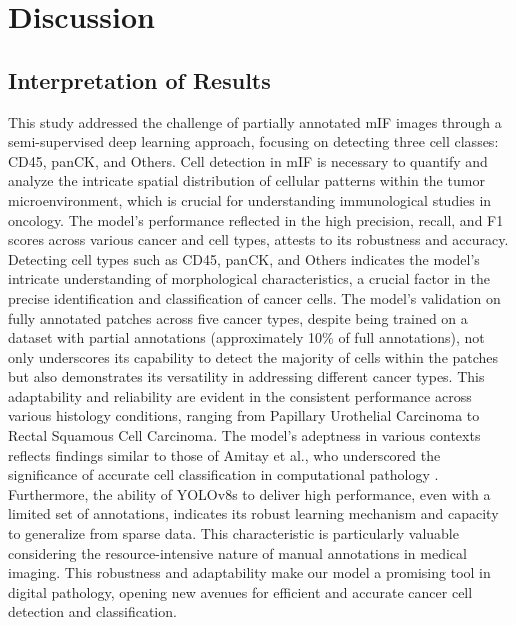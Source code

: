 \documentclass{midl} %
\begin{document}
\section{Discussion}
\subsection{Interpretation of Results}
This study addressed the challenge of partially annotated mIF images through a semi-supervised deep learning approach, focusing on detecting three cell classes: CD45, panCK, and Others. Cell detection in mIF is necessary to quantify and analyze the intricate spatial distribution of cellular patterns within the tumor microenvironment, which is crucial for understanding immunological studies in oncology. The model's performance reflected in the high precision, recall, and F1 scores across various cancer and cell types, attests to its robustness and accuracy. Detecting cell types such as CD45, panCK, and Others indicates the model's intricate understanding of morphological characteristics, a crucial factor in the precise identification and classification of cancer cells.
The model's validation on fully annotated patches across five cancer types, despite being trained on a dataset with partial annotations (approximately 10\% of full annotations), not only underscores its capability to detect the majority of cells within the patches but also demonstrates its versatility in addressing different cancer types. This adaptability and reliability are evident in the consistent performance across various histology conditions, ranging from Papillary Urothelial Carcinoma to Rectal Squamous Cell Carcinoma. The model's adeptness in various contexts reflects findings similar to those of Amitay et al., who underscored the significance of accurate cell classification in computational pathology \cite{amitay2023cellsighter}. Furthermore, the ability of YOLOv8s to deliver high performance, even with a limited set of annotations, indicates its robust learning mechanism and capacity to generalize from sparse data. This characteristic is particularly valuable considering the resource-intensive nature of manual annotations in medical imaging. This robustness and adaptability make our model a promising tool in digital pathology, opening new avenues for efficient and accurate cancer cell detection and classification.
\end{document}

